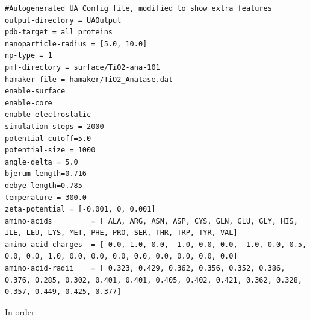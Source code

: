 \documentclass[10pt,a4paper,onecolumn]{report}
\begin{document}
\begin{lstlisting}
#Autogenerated UA Config file, modified to show extra features
output-directory = UAOutput
pdb-target = all_proteins
nanoparticle-radius = [5.0, 10.0]
np-type = 1
pmf-directory = surface/TiO2-ana-101
hamaker-file = hamaker/TiO2_Anatase.dat
enable-surface 
enable-core 
enable-electrostatic 
simulation-steps = 2000 
potential-cutoff=5.0 
potential-size = 1000 
angle-delta = 5.0 
bjerum-length=0.716 
debye-length=0.785 
temperature = 300.0
zeta-potential = [-0.001, 0, 0.001] 
amino-acids         = [ ALA, ARG, ASN, ASP, CYS, GLN, GLU, GLY, HIS, ILE, LEU, LYS, MET, PHE, PRO, SER, THR, TRP, TYR, VAL] 
amino-acid-charges  = [ 0.0, 1.0, 0.0, -1.0, 0.0, 0.0, -1.0, 0.0, 0.5, 0.0, 0.0, 1.0, 0.0, 0.0, 0.0, 0.0, 0.0, 0.0, 0.0, 0.0] 
amino-acid-radii    = [ 0.323, 0.429, 0.362, 0.356, 0.352, 0.386, 0.376, 0.285, 0.302, 0.401, 0.401, 0.405, 0.402, 0.421, 0.362, 0.328, 0.357, 0.449, 0.425, 0.377] 
\end{lstlisting}
In order:
\end{document}
